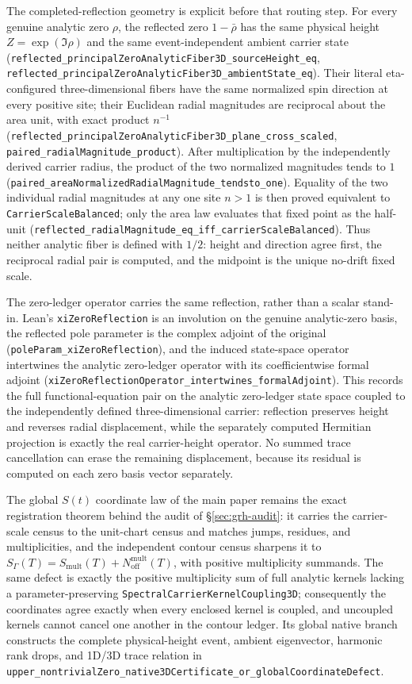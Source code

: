 \documentclass[11pt]{article}
\theoremstyle{definition}
\begin{document}
The completed-reflection geometry is explicit before that routing step.  For every
genuine analytic zero $\rho$, the reflected zero $1-\bar\rho$ has the same physical height
$Z=\exp(\Im\rho)$ and the same event-independent ambient carrier state
(\texttt{reflected\_principalZeroAnalyticFiber3D\_sourceHeight\_eq},
\texttt{reflected\_principalZeroAnalyticFiber3D\_ambientState\_eq}).  Their literal eta-configured
three-dimensional fibers have the same normalized spin direction at every positive site; their
Euclidean radial magnitudes are reciprocal about the area unit, with exact product $n^{-1}$
(\texttt{reflected\_principalZeroAnalyticFiber3D\_plane\_cross\_scaled},
\texttt{paired\_radialMagnitude\_product}).  After multiplication by the independently derived
carrier radius, the product of the two normalized magnitudes tends to $1$
(\texttt{paired\_areaNormalizedRadialMagnitude\_tendsto\_one}).  Equality of the two individual
radial magnitudes at any one site $n>1$ is then proved equivalent to
\texttt{CarrierScaleBalanced}; only the area law evaluates that fixed point as the half-unit
(\texttt{reflected\_radialMagnitude\_eq\_iff\_carrierScaleBalanced}).  Thus neither analytic
fiber is defined with $1/2$: height and direction agree first, the reciprocal radial pair is
computed, and the midpoint is the unique no-drift fixed scale.

The zero-ledger operator carries the same reflection, rather than a scalar stand-in.  Lean's
\texttt{xiZeroReflection} is an involution on the genuine analytic-zero basis, the reflected pole
parameter is the complex adjoint of the original
(\texttt{poleParam\_xiZeroReflection}), and the induced state-space operator intertwines the
analytic zero-ledger operator with its coefficientwise formal adjoint
(\texttt{xiZeroReflectionOperator\_intertwines\_formalAdjoint}).  This records the full
functional-equation pair on the analytic zero-ledger state space coupled to the independently
defined three-dimensional carrier: reflection preserves height and
reverses radial displacement, while the separately computed Hermitian projection is exactly the
real carrier-height operator.  No summed trace cancellation can erase the remaining displacement,
because its residual is computed on each zero basis vector separately.

The global \(S(t)\) coordinate law of the main paper remains the exact
registration theorem behind the audit of \S\ref{sec:grh-audit}: it carries
the carrier-scale census to the unit-chart census and matches jumps,
residues, and multiplicities, and the independent contour census sharpens it
to \(S_\Gamma(T)=S_{\mathrm{mult}}(T)+N_{\mathrm{off}}^{\mathrm{mult}}(T)\),
with positive multiplicity summands.  The same defect is exactly the
positive multiplicity sum of full analytic kernels lacking a
parameter-preserving \texttt{SpectralCarrierKernelCoupling3D}; consequently
the coordinates agree exactly when every enclosed kernel is coupled, and
uncoupled kernels cannot cancel one another in the contour ledger.  Its
global native branch constructs the complete physical-height event, ambient
eigenvector, harmonic rank drops, and 1D/3D trace relation in
\texttt{upper\_nontrivialZero\_native3DCertificate\_or\_globalCoordinateDefect}.
\end{document}
